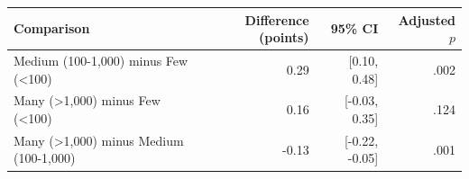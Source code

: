\begin{tabular}{lrrr}
\toprule
Comparison & Difference (points) & 95\% CI & Adjusted $p$ \\
\midrule
Medium (100-1,000) minus Few (\textless{}100) & 0.29 & [0.10, 0.48] & .002 \\
Many (\textgreater{}1,000) minus Few (\textless{}100) & 0.16 & [-0.03, 0.35] & .124 \\
Many (\textgreater{}1,000) minus Medium (100-1,000) & -0.13 & [-0.22, -0.05] & .001 \\
\bottomrule
\end{tabular}
